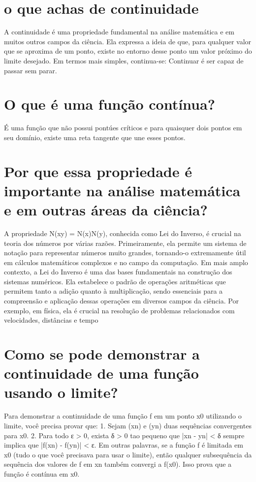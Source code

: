 \documentclass[11pt,a4paper]{article}
\begin{document}
\section{o que achas de continuidade}
A continuidade é uma propriedade fundamental na análise matemática e em muitos outros campos da ciência. Ela expressa a ideia de que, para qualquer valor que se aproxima de um ponto, existe no entorno desse ponto um valor próximo do limite desejado. Em termos mais simples, continua-se: Continuar é ser capaz de passar sem parar.

\section{O que é uma função contínua?}
É uma função que não possui pontúes críticos e para quaisquer dois pontos em seu domínio, existe uma reta tangente que une esses pontos.

\section{Por que essa propriedade é importante na análise matemática e em outras áreas da ciência?}
A propriedade N(xy) = N(x)N(y), conhecida como Lei do Inverso, é crucial na teoria dos números por várias razões. Primeiramente, ela permite um sistema de notação para representar números muito grandes, tornando-o extremamente útil em cálculos matemáticos complexos e no campo da computação. Em mais amplo contexto, a Lei do Inverso é uma das bases fundamentais na construção dos sistemas numéricos. Ela estabelece o padrão de operações aritméticas que permitem tanto a adição quanto à multiplicação, sendo essenciais para a compreensão e aplicação dessas operações em diversos campos da ciência. Por exemplo, em física, ela é crucial na resolução de problemas relacionados com velocidades, distâncias e tempo

\section{Como se pode demonstrar a continuidade de uma função usando o limite?}
Para demonstrar a continuidade de uma função f em um ponto x0 utilizando o limite, você precisa provar que: 1. Sejam (xn) e (yn) duas sequências convergentes para x0. 2. Para todo ε > 0, exista δ > 0 tao pequeno que |xn - yn| < δ sempre implica que |f(xn) - f(yn)| < ε. Em outras palavras, se a função f é limitada em x0 (tudo o que você precisava para usar o limite), então qualquer subsequência da sequência dos valores de f em xn também convergi a f(x0). Isso prova que a função é contínua em x0.
\end{document}
